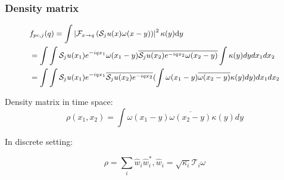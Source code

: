 \documentclass[UTF8]{beamer}
\begin{document}
\begin{frame}[c]\frametitle{Density matrix}
$$
\begin{small}
\begin{aligned}
&f_{p c, j}(q) = \int\left|\mathcal{F}_{x \rightarrow q}\left(\mathcal{S}_{j} u(x) \omega(x-y)\right)\right|^{2} \kappa(y) \mathrm{d} y\\
& = \int\int  
\mathcal{S}_{j} u(x_1)e^{-iqx_1} \omega(x_1-y)  \overline{ \mathcal{S}_{j} u(x_2)e^{-iqx_2} \omega(x_2-y) }   \int   \kappa(y)   dy
dx_1 dx_2 \\
& = \int\int  
\mathcal{S}_{j} u(x_1)e^{-iqx_1}  \overline{ \mathcal{S}_{j} u(x_2)e^{-iqx_2}  }   (\int  \omega(x_1-y) \overline{\omega(x_2-y)} \kappa(y)   dy)
dx_1 dx_2 \\
\end{aligned}
\end{small}
$$	

Density matrix in time space:
\begin{equation}
\rho(x_1,x_2) = \int  \omega(x_1-y) \overline{\omega(x_2-y)} \kappa(y)   dy
\end{equation}

In discrete setting:

\begin{equation}
\rho = \sum_i \hat{w}_i \hat{w}_i^*, \hat{w}_i = \sqrt{\kappa_{i}}\mathcal{T}_{i} \omega
\end{equation}

\end{frame}
\end{document}
